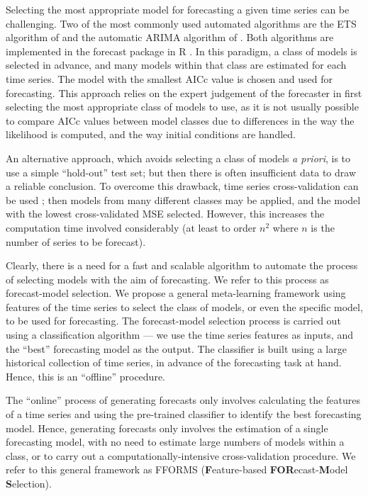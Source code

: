 \documentclass[11pt,a4paper,]{article}
\begin{document}
Selecting the most appropriate model for forecasting a given time series can be challenging. Two of the most commonly used automated algorithms are the ETS algorithm of \textcite{Hyndman2002} and the automatic ARIMA algorithm of \textcite{Hyndman2008}. Both algorithms are implemented in the forecast package in R \autocite{Rcore,forecast}. In this paradigm, a class of models is selected in advance, and many models within that class are estimated for each time series. The model with the smallest AICc value is chosen and used for forecasting. This approach relies on the expert judgement of the forecaster in first selecting the most appropriate class of models to use, as it is not usually possible to compare AICc values between model classes due to differences in the way the likelihood is computed, and the way initial conditions are handled.

An alternative approach, which avoids selecting a class of models \emph{a priori}, is to use a simple ``hold-out'' test set; but then there is often insufficient data to draw a reliable conclusion. To overcome this drawback, time series cross-validation can be used \autocite{racine2000consistent,hyndman2014forecasting}; then models from many different classes may be applied, and the model with the lowest cross-validated MSE selected. However, this increases the computation time involved considerably (at least to order \(n^2\) where \(n\) is the number of series to be forecast).

Clearly, there is a need for a fast and scalable algorithm to automate the process of selecting models with the aim of forecasting. We refer to this process as forecast-model selection. We propose a general meta-learning framework using features of the time series to select the class of models, or even the specific model, to be used for forecasting. The forecast-model selection process is carried out using a classification algorithm --- we use the time series features as inputs, and the ``best'' forecasting model as the output. The classifier is built using a large historical collection of time series, in advance of the forecasting task at hand. Hence, this is an ``offline'' procedure.

The ``online'' process of generating forecasts only involves calculating the features of a time series and using the pre-trained classifier to identify the best forecasting model. Hence, generating forecasts only involves the estimation of a single forecasting model, with no need to estimate large numbers of models within a class, or to carry out a computationally-intensive cross-validation procedure. We refer to this general framework as FFORMS (\textbf{F}eature-based \textbf{FOR}ecast-\textbf{M}odel \textbf{S}election).
\end{document}
